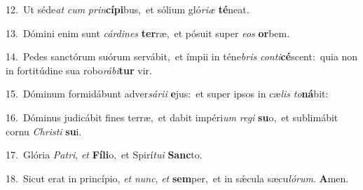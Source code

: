 {\numbfont\textcolor{\numbcolor}{12.}}~Ut séde\textit{at} \textit{cum} \textit{prin}\-\textbf{cí}\textbf{pi}bus,~\star et sólium gló\-\textit{ri}\-\textit{æ} \textbf{té}\-neat.\par
{\numbfont\textcolor{\numbcolor}{13.}}~Dómini enim sunt \textit{cár}\-\textit{di}\textit{nes} \textbf{ter}\-ræ,~\star et pósuit super \textit{e}\-\textit{os} \textbf{or}\-bem.\par
{\numbfont\textcolor{\numbcolor}{14.}}~Pedes sanctórum suórum servábit,~\dagger et ímpii in téne\textit{bris} \textit{con}\-\textit{ti}\textbf{cé}scent:~\star quia non in fortitúdine sua robo\-\textit{rá}\-\textit{bi}\textbf{tur} vir.\par
{\numbfont\textcolor{\numbcolor}{15.}}~Dóminum formidábunt adver\-\textit{sá}\-\textit{ri}\textit{i} \textbf{e}\-jus:~\star et super ipsos in cæ\textit{lis} \textit{to}\-\textbf{ná}bit:\par
{\numbfont\textcolor{\numbcolor}{16.}}~Dóminus judicábit fines terræ,~\dagger et dabit impéri\textit{um} \textit{re}\-\textit{gi} \textbf{su}\-o,~\star et sublimábit cornu \textit{Chris}\-\textit{ti} \textbf{su}\-i.\par
{\numbfont\textcolor{\numbcolor}{17.}}~Glória \textit{Pa}\-\textit{tri}, \textit{et} \textbf{Fí}\-\textbf{li}o,~\star et Spirí\-\textit{tu}\-\textit{i} \textbf{Sanc}\-to.\par
{\numbfont\textcolor{\numbcolor}{18.}}~Sicut erat in princípio, \textit{et} \textit{nunc}\-, \textit{et} \textbf{sem}\-per,~\star et in sǽcula sæcu\-\textit{ló}\-\textit{rum}. \textbf{A}\-men.\par
